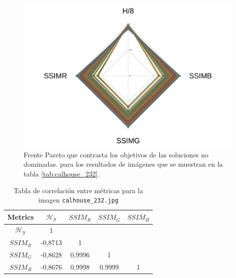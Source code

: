     \begin{figure}[H]
    \centering
    \includegraphics[width=\textwidth]{./Figures/calhouse_232/calhouse_0232_2.jpg}
    \caption{Frente Pareto que contrasta los objetivos de las soluciones no dominadas. para los resultados de imágenes que se muestran en la tabla \ref{tab:calhouse_232}.}
    \label{fig:calhouse2332fp}
    \end{figure}

\begin{table}[H]
\setlength{\abovecaptionskip}{2pt plus 3pt minus 2pt} %
\caption[Parámetros de entrada para $MOPSO$]{Tabla de correlación entre métricas para la imagen \texttt{calhouse\_232.jpg}}
\begin{center}
 \begin{tabular}{||c | c c c c||} 
 \hline
Metrics & $\mathscr{H_Y}$ & $SSIM_R$ & $SSIM_G$ & $SSIM_B$ \\ 
\hline
$\mathscr{H_Y}$ & 1 &  &  & \\ 
\hline
$SSIM_R$ & -0,8713 & 1 &  \\ 
\hline
$SSIM_G$ & -0,8628 & 0,9996  & 1  & \\ 
\hline
$SSIM_B$ & -0,8676 & 0,9998  & 0.9999  & 1 \\ 
\hline
\end{tabular}
\end{center}
\label{table:correlacion232}
\end{table}


